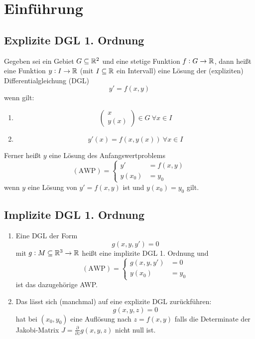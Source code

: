 \section{Einführung}
\subsection{Explizite DGL 1. Ordnung}
Gegeben sei ein Gebiet $G \subseteq \mathbb{R}^2$ und eine stetige Funktion $f: G \rightarrow \mathbb{R}$, dann heißt
eine Funktion $y: I \rightarrow \mathbb{R}$ (mit $I \subseteq \mathbb{R}$ ein Intervall) eine Lösung der (expliziten) Differentialgleichung (DGL)
\begin{equation*}
	y' = f(x, y)
\end{equation*}
wenn gilt:
\begin{enumerate}[label= (\alph*)]
	\item 
		\begin{equation*}
			\begin{pmatrix}
				x \\ y(x)
			\end{pmatrix}
			\in G\ \forall x \in I
		\end{equation*}
	\item 
		\begin{equation*}
			y'(x) = f(x,y(x))\ \forall x \in I		
		\end{equation*}
\end{enumerate}
Ferner heißt $y$ eine Lösung des Anfangswertproblems
\begin{equation*}
	(\text{AWP})  =
	\begin{cases}
		y' &= f(x,y) \\
		y(x_0) &= y_0
	\end{cases}
\end{equation*}
wenn $y$ eine Lösung von $y'=f(x,y)$ ist und $y(x_0) = y_0$ gilt.

\subsection{Implizite DGL 1. Ordnung}
\begin{enumerate}[label= (\alph*)]
	\item Eine DGL der Form
		\begin{equation*}
			g(x,y,y') = 0
		\end{equation*}
		mit $g: M \subseteq \mathbb{R}^3 \rightarrow \mathbb{R}$ heißt eine implizite DGL 1. Ordnung und
		\begin{equation*}
			(\text{AWP}) =
			\begin{cases}
				g(x,y,y') &= 0 \\
				y(x_0) &= y_0
			\end{cases}
		\end{equation*}
		ist das dazugehörige AWP.
	\item Das lässt sich (manchmal) auf eine explizite DGL zurückführen:
		\begin{equation*}
			g(x,y,z) = 0
		\end{equation*}
		hat bei $(x_0, y_0)$ eine Auflösung nach $z=f(x,y)$ falls die Determinate der Jakobi-Matrix
		$J = \frac{\partial}{\partial z} g(x,y,z)$ nicht null ist.
\end{enumerate}


